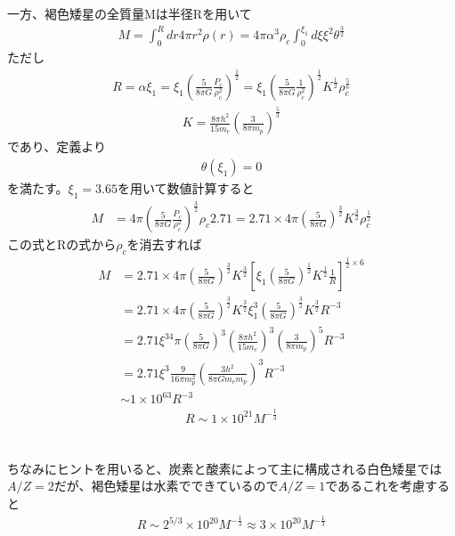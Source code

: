 一方、褐色矮星の全質量Mは半径Rを用いて
\begin{align*}
    M=\int^R_0dr4\pi r^2\rho(r)=4\pi\alpha^3\rho_c\int^{\xi_1}_0d\xi\xi^2\theta^{\frac{3}{2}}
\end{align*}
ただし
\begin{align*}
    R=\alpha\xi_1=\xi_1\left(\frac{5}{8\pi G}\frac{P_c}{\rho_c^2}\right)^{\frac{1}{2}}=\xi_1\left(\frac{5}{8\pi G}\frac{1}{\rho_c^2}\right)^{\frac{1}{2}}K^{\frac{1}{2}}\rho_c^{\frac{5}{6}}
\end{align*}
\begin{align*}
    K=\frac{8\pi h^2}{15m_e}\left(\frac{3}{8\pi m_p}\right)^{\frac{5}{3}}
\end{align*}
であり、定義より
\begin{align*}
    \theta(\xi_1)=0
\end{align*}
を満たす。$\xi_1=3.65$を用いて数値計算すると
\begin{align*}
    M&=4\pi\left(\frac{5}{8\pi G}\frac{P_c}{\rho_c^2}\right)^{\frac{3}{2}}\rho_c2.71=2.71\times4\pi\left(\frac{5}{8\pi G}\right)^{\frac{3}{2}}K^{\frac{3}{2}}\rho_c^{\frac{1}{2}}
\end{align*}
この式とRの式から$\rho_c$を消去すれば
\begin{align*}
    M&=2.71\times4\pi\left(\frac{5}{8\pi G}\right)^{\frac{3}{2}}K^{\frac{3}{2}}\left[\xi_1\left(\frac{5}{8\pi G}\right)^{\frac{1}{2}}K^{\frac{1}{2}}\frac{1}{R}\right]^{\frac{1}{2}\times6}\nonumber\\
    &=2.71\times4\pi\left(\frac{5}{8\pi G}\right)^{\frac{3}{2}}K^{\frac{3}{2}}\xi_1^3\left(\frac{5}{8\pi G}\right)^{\frac{3}{2}}K^{\frac{3}{2}}R^{-3}\nonumber\\
    &=2.71\xi^34\pi\left(\frac{5}{8\pi G}\right)^3\left(\frac{8\pi h^2}{15m_e}\right)^3\left(\frac{3}{8\pi m_p}\right)^5R^{-3}\nonumber\\
    &=2.71\xi^3\frac{9}{16\pi m_p^2}\left(\frac{3h^2}{8\pi Gm_em_p}\right)^3R^{-3}\nonumber\\
    &\sim1\times10^{63}R^{-3}
\end{align*}
\begin{align}
    R\sim1\times10^{21}M^{-\frac{1}{3}}
\end{align}\\
\hrulefill\\
ちなみにヒントを用いると、炭素と酸素によって主に構成される白色矮星では$A/Z=2$だが、褐色矮星は水素でできているので$A/Z=1$であるこれを考慮すると
\begin{align}
    R\sim2^{5/3}\times10^{20}M^{-\frac{1}{3}}\approx3\times10^{20}M^{-\frac{1}{3}}
\end{align}
